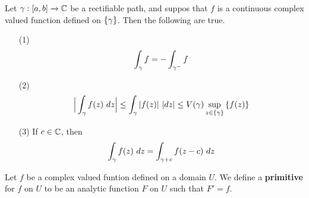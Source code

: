 \begin{lemma}\label{4.2.3}
    Let $\gamma:[a,b] \xrightarrow{} \mathbb{C}$ be a rectifiable path, and suppos that $f$
    is a continuous complex valued function defined on  $\{\gamma\}$. Then the
    following are true.
    \begin{enumerate}
        \item[(1)] $$\int_\gamma{f}=-\int_{\gamma^-}{f}$$

        \item[(2)] $$\Big{|} \int_\gamma{f(z) \ dz} \Big{|} \leq \int_\gamma{|f(z)| \ |dz|}
            \leq V(\gamma)\sup_{z \in \{\gamma\}}{\{f(z)\}}$$

        \item[(3)] If $c \in \mathbb{C}$, then $$\int_\gamma{f(z) \ dz}=
            \int_{\gamma+c} {f(z-c) \ dz}$$
    \end{enumerate}
\end{lemma}

\begin{definition}
    Let $f$ be a complex valued funtion defined on a domain  $U$. We define a
     \textbf{primitive} for $f$ on  $U$ to be an analytic function  $F$ on  $U$
     such that  $F'=f$.
\end{definition}


